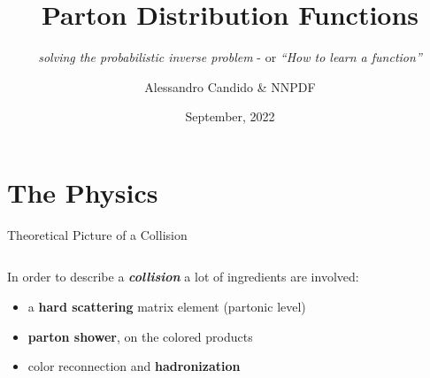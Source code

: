 \documentclass[9pt]{beamer}
\title{Parton Distribution Functions}
\subtitle{
    \textit{solving the probabilistic inverse problem} - or
    \textit{\enquote{How to learn a function}}
}
\date{September, 2022}
\author{Alessandro Candido \& \textsc{NNPDF}}
\begin{document}
\maketitle


\section{The Physics}

\begin{frame}{Theoretical Picture of a Collision}
    \begin{columns}
        \begin{column}{0.5\textwidth}
            In order to describe a \textit{\textbf{collision}} a lot of ingredients are
            involved:
            \begin{itemize}
                \item a \textbf{hard scattering} matrix element (partonic level)
                \item \textbf{parton shower}, on the colored products
                \item color reconnection and \textbf{hadronization}
            \end{itemize}


\end{column}
\end{columns}
\end{frame}
\end{document}
